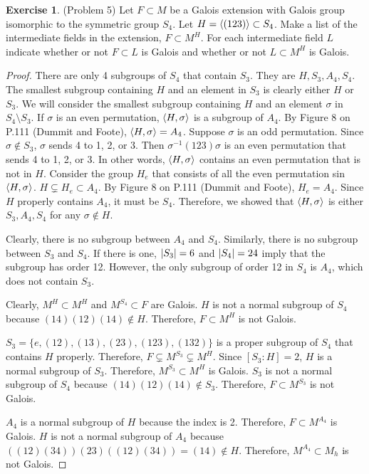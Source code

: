 \documentclass[12pt, psamsfonts]{amsart}
\theoremstyle{definition}
\newtheorem*{exer}{Exercise}
\theoremstyle{remark}
\numberwithin{equation}{section}
\begin{document}
\begin{exer}{(Problem 5)}
  Let $F \subset M$ be a Galois extension with Galois group isomorphic to the symmetric group $S_4$.
  Let $H = \ev{(123)} \subset S_4$.
  Make a list of the intermediate fields in the extension, $F \subset M^H$.
  For each intermediate field $L$ indicate whether or not $F \subset L$ is Galois and whether or not $L \subset M^H$ is Galois.
\end{exer}

\begin{proof}
  There are only 4 subgroups of $S_4$ that contain $S_3$.
  They are $H, S_3, A_4, S_4$.
  The smallest subgroup containing $H$ and an element in $S_3$ is clearly either $H$ or $S_3$.
  We will consider the smallest subgroup containing $H$ and an element $\sigma$ in $S_4 \setminus S_3$.
  If $\sigma$ is an even permutation, $\ev{ H, \sigma }$ is a subgroup of $A_4$.
  By Figure 8 on P.111 (Dummit and Foote), $\ev{ H, \sigma} = A_4$.
  Suppose $\sigma$ is an odd permutation.
  Since $\sigma \notin S_3$, $\sigma$ sends 4 to 1, 2, or 3.
  Then $\sigma^{-1}(123)\sigma$ is an even permutation that sends 4 to 1, 2, or 3.
  In other words, $\ev{ H, \sigma }$ contains an even permutation that is not in $H$.
  Consider the group $H_e$ that consists of all the even permutation sin $\ev{ H, \sigma }$.
  $H \subsetneq H_e \subset A_4$.
  By Figure 8 on P.111 (Dummit and Foote), $H_e = A_4$.
  Since $H$ properly contains $A_4$, it must be $S_4$.
  Therefore, we showed that $\ev{ H, \sigma }$ is either $S_3, A_4, S_4$ for any $\sigma \notin H$.

  Clearly, there is no subgroup between $A_4$ and $S_4$.
  Similarly, there is no subgroup between $S_3$ and $S_4$.
  If there is one, $\abs{S_3} = 6$ and $\abs{S_4} = 24$ imply that the subgroup has order 12.
  However, the only subgroup of order 12 in $S_4$ is $A_4$, which does not contain $S_3$.

  Clearly, $M^H \subset M^H$ and $M^{S_4} \subset F$ are Galois.
  $H$ is not a normal subgroup of $S_4$ because $(14)(12)(14) \notin H$.
  Therefore, $F \subset M^H$ is not Galois.

  $S_3 = \{ e, (12), (13), (23), (123), (132) \}$ is a proper subgroup of $S_4$ that contains $H$ properly.
  Therefore, $F \subsetneq M^{S_3} \subsetneq M^H$.
  Since $[S_3:H] = 2$, $H$ is a normal subgroup of $S_3$.
  Therefore, $M^{S_3} \subset M^{H}$ is Galois.
  $S_3$ is not a normal subgroup of $S_4$ because $(14)(12)(14) \notin S_3$.
  Therefore, $F \subset M^{S_3}$ is not Galois.

  $A_4$ is a normal subgroup of $H$ because the index is 2.
  Therefore, $F \subset M^{A_4}$ is Galois.
  $H$ is not a normal subgroup of $A_4$ because $((12)(34))(23)((12)(34)) = (14) \notin H$.
  Therefore, $M^{A_4} \subset M_h$ is not Galois.
\end{proof}
\end{document}
